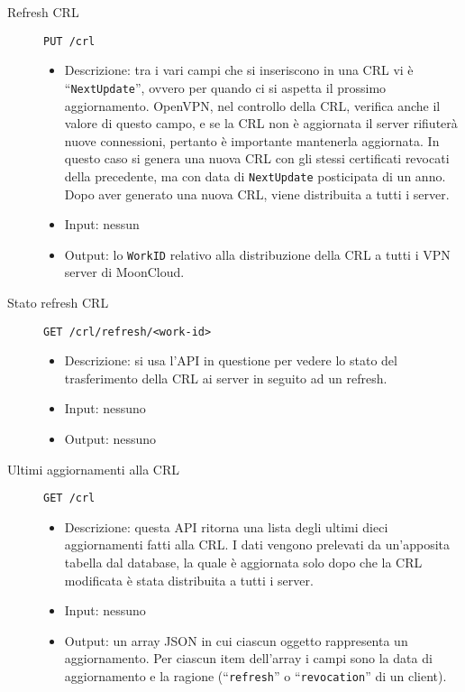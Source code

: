 \begin{description}
    \item[Refresh CRL]\texttt{PUT /crl}
    \begin{itemize}
        \item Descrizione: tra i vari campi che si inseriscono in una CRL vi
        è ``\texttt{NextUpdate}'', ovvero per quando ci si aspetta il prossimo
        aggiornamento. OpenVPN, nel controllo della CRL, verifica anche il valore di
        questo campo, e se la CRL non è aggiornata il server rifiuterà nuove connessioni,
        pertanto è importante mantenerla aggiornata. In questo caso si genera una
        nuova CRL con gli stessi certificati revocati della precedente, ma con data
        di \texttt{NextUpdate} posticipata di un anno. Dopo aver generato una
        nuova CRL, viene distribuita a tutti i server.
        \item Input: nessun
        \item Output: lo \texttt{WorkID} relativo alla distribuzione della CRL
        a tutti i VPN server di MoonCloud.
    \end{itemize}

    \item[Stato refresh CRL]\texttt{GET /crl/refresh/<work-id>}
    \begin{itemize}
        \item Descrizione: si usa l'API in questione per vedere lo stato
        del trasferimento della CRL ai server in seguito ad un refresh.
        \item Input: nessuno
        \item Output: nessuno
    \end{itemize}

    \item[Ultimi aggiornamenti alla CRL]\texttt{GET /crl}
    \begin{itemize}
        \item Descrizione: questa API ritorna una lista degli ultimi dieci aggiornamenti
        fatti alla CRL. I dati vengono prelevati da un'apposita tabella
        dal database, la quale è aggiornata solo dopo che la CRL modificata è stata distribuita
        a tutti i server.
        \item Input: nessuno 
        \item Output: un array JSON in cui ciascun oggetto rappresenta un aggiornamento.
        Per ciascun item dell'array i campi sono la data di aggiornamento  e la ragione
        (``\texttt{refresh}'' o ``\texttt{revocation}'' di un client). 
    \end{itemize}


\end{description}
